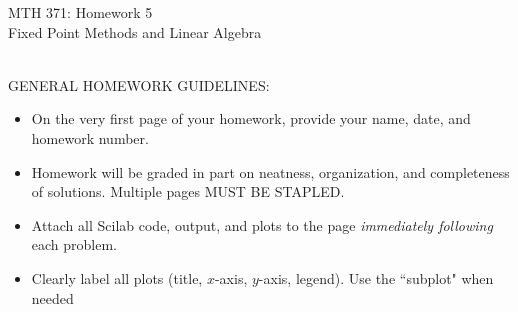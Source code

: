 \documentclass[addpoints, 11pt]{exam}
\begin{document}
\vspace{100mm}
\begin{center} \Large
MTH 371: Homework 5 \\ Fixed Point Methods and Linear Algebra \normalsize
\end{center}
\ \\
\noindent GENERAL HOMEWORK GUIDELINES: 
\begin{itemize}
\item On the very first page of your homework, provide your name, date, and homework number.\vspace{-2mm}
\item Homework will be graded in part on neatness, organization, and completeness of solutions. Multiple pages MUST BE STAPLED. \vspace{-2mm}
\item Attach all Scilab code, output, and plots to the page \emph{immediately following} each problem. \vspace{-2mm}
\item Clearly label all plots (title, $x$-axis, $y$-axis, legend). Use the ``subplot" when needed
\end{itemize}
\end{document}
